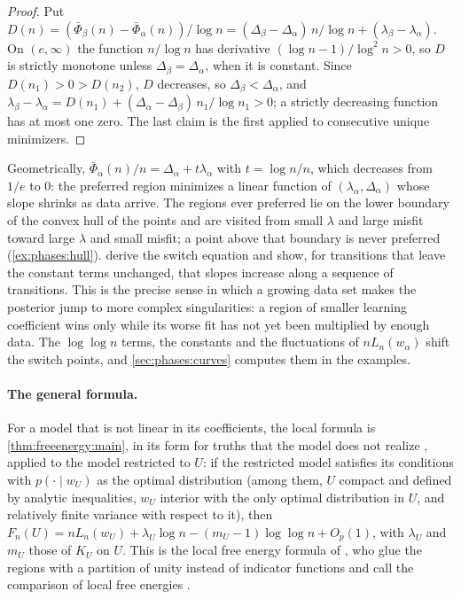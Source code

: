 \begin{refsection}
\begin{proof}
Put $D(n)=(\bar\Phi_\beta(n)-\bar\Phi_\alpha(n))/\log n=(\Delta_\beta-\Delta_\alpha)\,n/\log n+(\lambda_\beta-\lambda_\alpha)$. On $(e,\infty)$ the function $n/\log n$ has derivative $(\log n-1)/\log^2n>0$, so $D$ is strictly monotone unless $\Delta_\beta=\Delta_\alpha$, when it is constant. Since $D(n_1)>0>D(n_2)$, $D$ decreases, so $\Delta_\beta<\Delta_\alpha$, and $\lambda_\beta-\lambda_\alpha=D(n_1)+(\Delta_\alpha-\Delta_\beta)\,n_1/\log n_1>0$; a strictly decreasing function has at most one zero. The last claim is the first applied to consecutive unique minimizers.
\end{proof}

Geometrically, $\bar\Phi_\alpha(n)/n=\Delta_\alpha+t\lambda_\alpha$ with $t=\log n/n$, which decreases from $1/e$ to $0$: the preferred region minimizes a linear function of $(\lambda_\alpha,\Delta_\alpha)$ whose slope shrinks as data arrive. The regions ever preferred lie on the lower boundary of the convex hull of the points and are visited from small $\lambda$ and large misfit toward large $\lambda$ and small misfit; a point above that boundary is never preferred (\cref{ex:phases:hull}). \Textcite[App.~C]{ChenEtAl2023} derive the switch equation and show, for transitions that leave the constant terms unchanged, that slopes increase along a sequence of transitions. This is the precise sense in which a growing data set makes the posterior jump to more complex singularities: a region of smaller learning coefficient wins only while its worse fit has not yet been multiplied by enough data. The $\log\log n$ terms, the constants and the fluctuations of $nL_n(w_\alpha)$ shift the switch points, and \cref{sec:phases:curves} computes them in the examples.

\paragraph{The general formula.} For a model that is not linear in its coefficients, the local formula is \cref{thm:freeenergy:main}, in its form for truths that the model does not realize \parencite{Watanabe2010d}, applied to the model restricted to $U$: if the restricted model satisfies its conditions with $p(\cdot\mid w_U)$ as the optimal distribution (among them, $U$ compact and defined by analytic inequalities, $w_U$ interior with the only optimal distribution in $U$, and relatively finite variance with respect to it), then $F_n(U)=nL_n(w_U)+\lambda_U\log n-(m_U-1)\log\log n+O_p(1)$, with $\lambda_U$ and $m_U$ those of $K_U$ on $U$. This is the local free energy formula of \textcite[eq.~(8)]{ChenEtAl2023}, who glue the regions with a partition of unity instead of indicator functions and call the comparison of local free energies .


\end{refsection}
